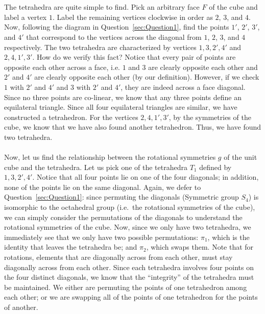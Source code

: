 \documentclass[letterpaper]{article}
\begin{document}
\section{}
\label{sec:Question2}

The tetrahedra are quite simple to find.
Pick an arbitrary face $ F $ of the cube and label a vertex $ 1 $.
Label the remaining vertices clockwise in order as $ 2 $, $ 3 $, and $ 4 $.
Now, following the diagram in Question~\ref{sec:Question1}, find the points $ 1' $, $ 2' $, $ 3' $, and $ 4' $ that correspond to the vertices across the diagonal from $ 1 $, $ 2 $, $ 3 $, and $ 4 $ respectively.
The two tetrahedra are characterized by vertices $ 1, 3, 2', 4' $ and $ 2, 4, 1', 3' $.
How do we verify this fact?
Notice that every pair of points are opposite each other across a face, i.e. $ 1 $ and $ 3 $ are clearly opposite each other and $ 2' $ and $ 4' $ are clearly opposite each other (by our definition).
However, if we check $ 1 $ with $ 2' $ and $ 4' $ and $ 3 $ with $ 2' $ and $ 4' $, they are indeed across a face diagonal.
Since no three points are co-linear, we know that any three points define an equilateral triangle.
Since all four equilateral triangles are similar, we have constructed a tetrahedron.
For the vertices $ 2, 4, 1', 3' $, by the symmetries of the cube, we know that we have also found another tetrahedron.
Thus, we have found two tetrahedra.
\\ \\
Now, let us find the relationship between the rotational symmetries $ g $ of the unit cube and the tetrahedra.
Let us pick one of the tetrahedra $ T_1 $ defined by $ 1, 3, 2', 4' $.
Notice that all four points lie on one of the four diagonals; in addition, none of the points lie on the same diagonal.
Again, we defer to Question~\ref{sec:Question1}:
since permuting the diagonals (Symmetric group $ S_4 $) is isomorphic to the octahedral group (i.e.\ the rotational symmetries of the cube), we can simply consider the permutations of the diagonals to understand the rotational symmetries of the cube.
Now, since we only have two tetrahedra, we immediately see that we only have two possible permutations: $ \pi_1 $, which is the identity that leaves the tetrahedra be; and $ \pi_2 $, which swaps them.
Note that for rotations, elements that are diagonally across from each other, must stay diagonally across from each other.
Since each tetrahedra involves four points on the four distinct diagonals, we know that the ``integrity'' of the tetrahedra must be maintained.
We either are permuting the points of one tetrahedron among each other; or we are swapping all of the points of one tetrahedron for the points of another.
\end{document}

